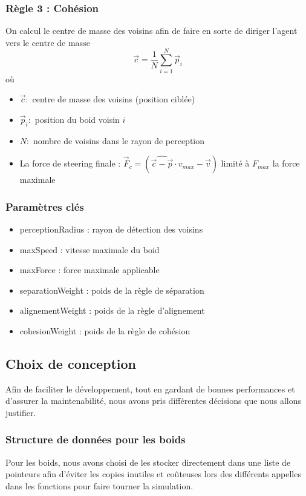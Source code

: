 \documentclass[11pt,a4paper]{article}
\begin{document}
\subsubsection{Règle 3 : Cohésion}
On calcul le centre de masse des voisins afin de faire en sorte de diriger l'agent vers le centre de masse 
\begin{equation}
    \vec{c} = \frac{1}{N}\sum_{i = 1}^{N}\vec{p}_{i}
\end{equation}
où
\begin{itemize}
    \item $\vec{c} : $ centre de masse des voisins (position ciblée)
    \item $\vec{p}_{i} :$ position du boid voisin $i$
    \item $N : $ nombre de voisins dans le rayon de perception 
    \item La force de steering finale : $\vec{F}_{c} = (\widehat{\vec{c} - \vec{p}} \cdot v_{max} - \vec{v})$ limité à $F_{max}$ la force maximale
\end{itemize}

\subsubsection{Paramètres clés}
\begin{itemize}
    \item perceptionRadius : rayon de détection des voisins
    \item maxSpeed : vitesse maximale du boid
    \item maxForce : force maximale applicable
    \item separationWeight : poids de la règle de séparation
    \item alignementWeight : poids de la règle d'alignement
    \item cohesionWeight : poids de la règle de cohésion
\end{itemize}

\subsection{Choix de conception}
Afin de faciliter le développement, tout en gardant de bonnes performances et d'assurer la maintenabilité, nous avons pris différentes décisions que nous allons justifier.

\subsubsection{Structure de données pour les boids}
Pour les boids, nous avons choisi de les stocker directement dans une liste de pointeurs afin d'éviter les copies inutiles et coûteuses lors des différents appelles dans les fonctions pour faire tourner la simulation.
\end{document}
